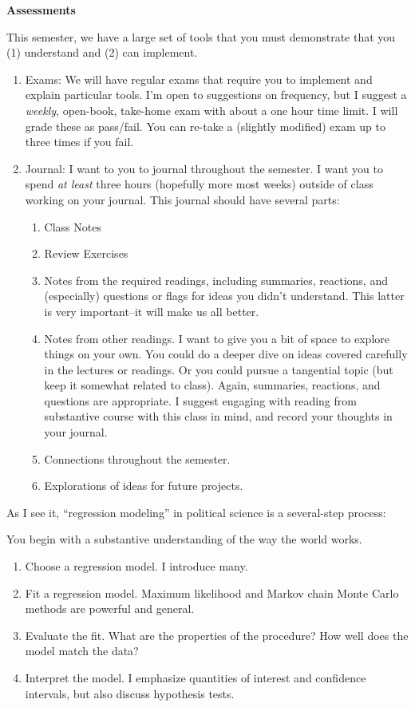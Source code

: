\documentclass[
]{book}
\providecommand{\tightlist}{%
  \setlength{\itemsep}{0pt}\setlength{\parskip}{0pt}}
\begin{document}
\textbf{Assessments}

This semester, we have a large set of tools that you must demonstrate that you (1) understand and (2) can implement.

\begin{enumerate}
\def\labelenumi{\arabic{enumi}.}
\tightlist
\item
  Exams: We will have regular exams that require you to implement and explain particular tools. I'm open to suggestions on frequency, but I suggest a \emph{weekly}, open-book, take-home exam with about a one hour time limit. I will grade these as pass/fail. You can re-take a (slightly modified) exam up to three times if you fail.
\item
  Journal: I want to you to journal throughout the semester. I want you to spend \emph{at least} three hours (hopefully more most weeks) outside of class working on your journal. This journal should have several parts:

  \begin{enumerate}
  \def\labelenumii{\alph{enumii}.}
  \tightlist
  \item
    Class Notes
  \item
    Review Exercises
  \item
    Notes from the required readings, including summaries, reactions, and (especially) questions or flags for ideas you didn't understand. This latter is very important--it will make us all better.
  \item
    Notes from other readings. I want to give you a bit of space to explore things on your own. You could do a deeper dive on ideas covered carefully in the lectures or readings. Or you could pursue a tangential topic (but keep it somewhat related to class). Again, summaries, reactions, and questions are appropriate. I suggest engaging with reading from substantive course with this class in mind, and record your thoughts in your journal.
  \item
    Connections throughout the semester.
  \item
    Explorations of ideas for future projects.
  \end{enumerate}
\end{enumerate}

As I see it, ``regression modeling'' in political science is a several-step process:

You begin with a substantive understanding of the way the world works.

\begin{enumerate}
\def\labelenumi{\arabic{enumi}.}
\tightlist
\item
  Choose a regression model. I introduce many.
\item
  Fit a regression model. Maximum likelihood and Markov chain Monte Carlo methods are powerful and general.
\item
  Evaluate the fit. What are the properties of the procedure? How well does the model match the data?
\item
  Interpret the model. I emphasize quantities of interest and confidence intervals, but also discuss hypothesis tests.
\end{enumerate}
\end{document}
